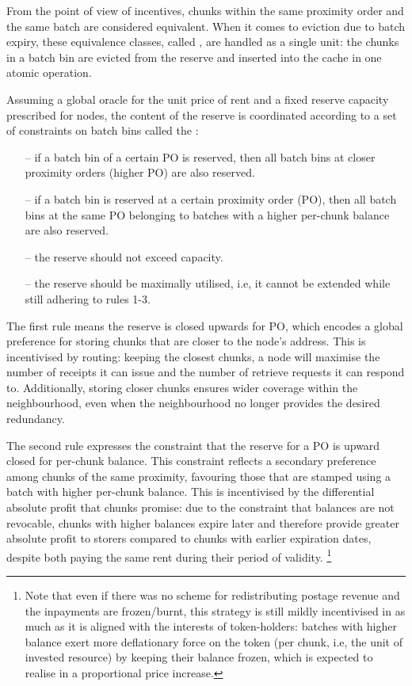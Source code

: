 From the point of view of incentives, chunks within the same proximity order and the same batch are considered equivalent. When it comes to eviction due to batch expiry, these equivalence classes, called , are handled as a single unit: the chunks in a batch bin are evicted from the reserve and inserted into the cache in one atomic operation. 

Assuming a global oracle for the unit price of rent and a fixed reserve capacity prescribed for nodes, the content of the reserve is coordinated according to a set of constraints on batch bins called the :
\begin{itemize}[noitemsep]
    \item[--] if a batch bin of a certain PO is reserved, then all batch bins at closer proximity orders (higher PO) are also reserved. 
    \item[--] if a batch bin is reserved at a certain proximity order (PO), then all batch bins at the same PO belonging to batches with a higher per-chunk balance are also reserved. 
    \item[--] the reserve should not exceed capacity.
    \item[--] the reserve should be maximally utilised, i.e, it cannot be extended while still adhering to rules 1-3.
\end{itemize}

The first rule means the reserve is closed upwards for PO, which encodes a global preference for  storing chunks that are closer to the node's address. This is incentivised by routing: keeping the closest chunks, a node will maximise the number of receipts it can issue and the number of retrieve requests it can respond to. Additionally, storing closer chunks ensures wider coverage within the neighbourhood, even when the neighbourhood no longer provides the desired redundancy.

The second rule expresses the constraint that the reserve for a PO is upward closed for per-chunk balance. This constraint reflects a secondary preference among chunks of the same proximity, favouring those that are stamped using a batch with higher per-chunk balance. This is incentivised by the differential absolute profit that chunks promise: due to the constraint that balances are not revocable, chunks with higher balances expire later and therefore provide greater absolute profit to storers compared to chunks with earlier expiration dates, despite both paying the same rent during their period of validity.%
%
\footnote{Note that even if there was no scheme for redistributing postage revenue and the inpayments are frozen/burnt, this strategy is still mildly incentivised in as much as it is aligned with the interests of token-holders: batches with higher balance exert more deflationary force on the token (per chunk, i.e, the unit of invested resource) by keeping their balance frozen, which is expected to realise in a proportional price increase.}


